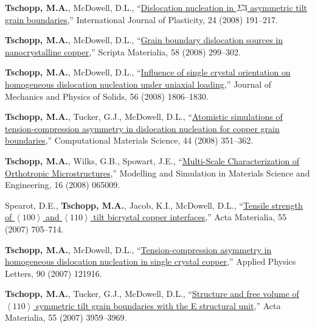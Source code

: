 \begin{cvlist}
\item 
\textbf{Tschopp, M.A.}, McDowell, D.L., ``\href{http://dx.DOI.org/10.1016/j.ijplas.2007.02.010}{Dislocation nucleation in $\Sigma3$ asymmetric tilt grain boundaries},'' International Journal of Plasticity, 24 (2008) 191--217.

\item 
\textbf{Tschopp, M.A.}, McDowell, D.L., ``\href{http://dx.DOI.org/10.1016/j.scriptamat.2007.10.010}{Grain boundary dislocation sources in nanocrystalline copper},'' Scripta Materialia, 58 (2008) 299--302.

\item 
\textbf{Tschopp, M.A.}, McDowell, D.L., ``\href{http://dx.DOI.org/10.1016/j.jmps.2007.11.012}{Influence of single crystal orientation on homogeneous dislocation nucleation under uniaxial loading},'' Journal of Mechanics and Physics of Solids, 56 (2008) 1806--1830.

\item 
\textbf{Tschopp, M.A.}, Tucker, G.J., McDowell, D.L., ``\href{http://dx.DOI.org/10.1016/j.commatsci.2008.03.041}{Atomistic simulations of tension-compression asymmetry in dislocation nucleation for copper grain boundaries},'' Computational Materials Science, 44 (2008) 351--362.

\item 
\textbf{Tschopp, M.A.}, Wilks, G.B., Spowart, J.E., ``\href{http://dx.DOI.org/10.1088/0965-0393/16/6/065009}{Multi-Scale Characterization of Orthotropic Microstructures},'' Modelling and Simulation in Materials Science and Engineering, 16 (2008) 065009.

\item 
Spearot, D.E., \textbf{Tschopp, M.A.}, Jacob, K.I., McDowell, D.L., ``\href{http://dx.DOI.org/10.1016/j.actamat.2006.08.060}{Tensile strength of $\left\langle 100\right\rangle$ and $\left\langle 110\right\rangle$ tilt bicrystal copper interfaces},'' Acta Materialia, 55 (2007) 705--714.

\item 
\textbf{Tschopp, M.A.}, McDowell, D.L., ``\href{http://dx.DOI.org/10.1063/1.2715137}{Tension-compression asymmetry in homogeneous dislocation nucleation in single crystal copper},'' Applied Physics Letters, 90 (2007) 121916.

\item 
\textbf{Tschopp, M.A.}, Tucker, G.J., McDowell, D.L., ``\href{http://dx.DOI.org/10.1016/j.actamat.2007.03.012}{Structure and free volume of $\left\langle 110\right\rangle$ symmetric tilt grain boundaries with the E structural unit},'' Acta Materialia, 55 (2007) 3959--3969.


\end{cvlist}
